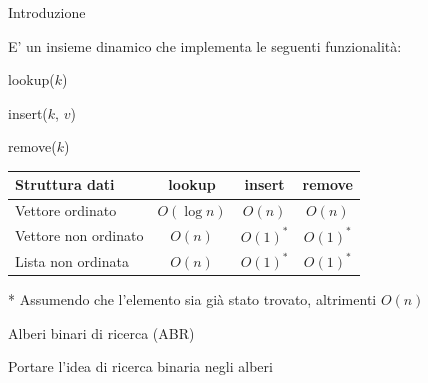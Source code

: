 \begin{frame}{Introduzione}

\vspace{-6pt}
\begin{myboxtitle}[Dizionario]
E' un insieme dinamico che implementa le seguenti funzionalità:
\BIL
\item \Item \textsf{lookup}(\Item $k$)
\item \textsf{insert}(\Item $k$, \Item $v$)
\item \textsf{remove}(\Item $k$)
\EIL
\end{myboxtitle}

\begin{myboxtitle}

\begin{tabular}{|l|c|c|c|}
\hline
Struttura dati & \textsf{lookup} & \textsf{insert} & \textsf{remove} \\\hline
Vettore ordinato &  $O(\log n)$ & $O(n)$ & $O(n)$ \\\hline
Vettore non ordinato &  $O(n)$ & $O(1)^*$ & $O(1)^*$ \\\hline
Lista non ordinata &  $O(n)$ & $O(1)^*$ & $O(1)^*$ \\\hline
\end{tabular}

\footnotesize
* Assumendo che l'elemento sia già stato trovato, altrimenti $O(n)$
\end{myboxtitle}

\end{frame}


\begin{frame}{Alberi binari di ricerca (ABR)}


\begin{myboxtitle}
Portare l'idea di ricerca binaria negli alberi
\end{myboxtitle}

\end{frame}


